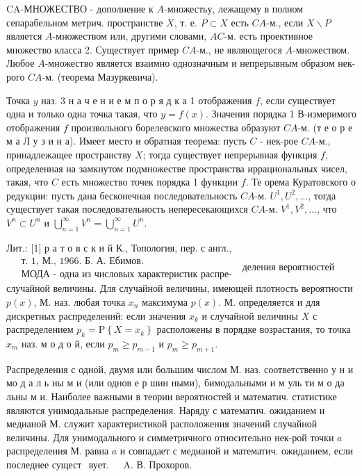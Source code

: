 \documentclass[10pt]{article}
\begin{document}
CA-МНОЖЕСТВО - дополнение к $A$-множестьу, лежащему в полном сепарабельном метрич. пространстве $X$, т. е. $P \subset X$ есть $C A$-м., если $X \backslash P$ является $A$-множеством или, другими словами, $A C$-м. есть проективное множество класса 2. Существует пример $C A$-м., не являющегося $A$-множеством. Любое $A$-множество является взаимно однозначным и непрерывным образом нек-рого $C A$-м. (теорема Мазуркевича).



Точка $y$ наз. 3 н а ч е н и е м п о р я д к а 1 отображения $f$, если существует одна и только одна точка такая, что $y=f(x)$. Значения порядка 1 В-измеримого отображения $f$ произвольного борелевского множества образуют $C A$-м. (т е о р е м а Л у з и н а). Имеет место и обратная теорема: пусть $C$ - нек-рое $C A$-м., принадлежащее пространству $X$; тогда существует непрерывная функция $f$, определенная на замкнутом подмножестве пространства иррациональных чисел, такая, что $C$ есть множество точек порядка 1 функции $f$. Те орема Куратовского о редукции: пусть дана бесконечная последовательность $C A$-м. $U^{1}, U^{2}, \ldots$, тогда существует такая последовательность непересекающихся $C A$-м. $V^{1}, V^{2}, \ldots$, что $V^{n} \subset U^{n}$ и $\bigcup_{n=1}^{\infty} V^{n}=\bigcup_{n=1}^{\infty} U^{n}$.



Лит.: [1] р а т о в с к и й К., Топология, пер. с англ., $\begin{aligned} & \text { т. 1, М., } 1966 . \text { Б. А. Ебимов. } \\ & \text { МОДА - одна из числовых характеристик распре- }\end{aligned}$ деления вероятностей случайной величины. Для случайной величины, имеющей плотность вероятности $p(x)$, М. наз. любая точка $x_{n}$ максимума $p(x)$. М. определяется и для дискретных распределений: если значения $x_{k}$ и случайной величины $X$ с распределением $p_{k}=\mathrm{P}\left\{X=x_{k}\right\}$ расположены в порядке возрастания, то точка $x_{m}$ наз. м о д о й, если $p_{m} \geqslant p_{m-1}$ и $p_{m} \geqslant p_{m+1}$.



Распределения с одной, двумя или большим числом М. наз. соответственно у н и мо д а л ь ны м и (или однов е р шин ными), бимодальными и м уль ти м о да льны м и. Наиболее важными в теории вероятностей и математич. статистике являются унимодальные распределения. Наряду с математич. ожиданием и медианой М. служит характеристикой расположения значений случайной величины. Для унимодального и симметричного относительно нек-рой точки $a$ распределения М. равна $a$ и совпадает с медианой и математич. ожиданием, если последнее сущест$\begin{array}{ll}\text { вует. } & \text { A. В. Прохоров. }\end{array}$
\end{document}
